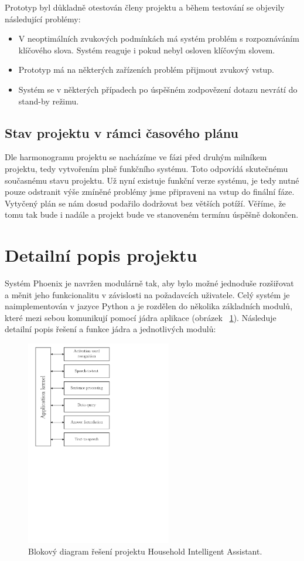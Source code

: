 \documentclass[12pt,a4paper]{article}
\begin{document}
Prototyp byl důkladně otestován členy projektu a během testování se objevily následující problémy: 
\begin{itemize}
	\item V neoptimálních zvukových podmínkách má systém problém s rozpoznáváním klíčového slova. Systém reaguje i pokud nebyl osloven klíčovým slovem.
	\item Prototyp má na některých zařízeních problém přijmout zvukový vstup.
	\item Systém se v některých případech po úspěšném zodpovězení dotazu nevrátí do stand-by režimu.
\end{itemize}


\subsection*{Stav projektu v rámci časového plánu}
Dle harmonogramu projektu se nacházíme ve fázi před druhým milníkem projektu, tedy vytvořením plně funkčního systému. Toto odpovídá skutečnému současnému stavu projektu. Už nyní existuje funkční verze systému, je tedy nutné pouze odstranit výše zmíněné problémy jsme připraveni na vstup do finální fáze. Vytyčený plán se nám dosud podařilo dodržovat bez větších potíží. Věříme, že tomu tak bude i nadále a projekt bude ve stanoveném termínu úspěšně dokončen.



\section*{Detailní popis projektu}
Systém Phoenix je navržen modulárně tak, aby bylo možné jednoduše rozšiřovat a měnit jeho funkcionalitu v závislosti na požadavcích uživatele. Celý systém je naimplementován v jazyce Python a je rozdělen do několika základních modulů, které mezi sebou komunikují pomocí jádra aplikace (obrázek ~\ref*{fig:diagram_api}). Následuje detailní popis řešení a funkce jádra a jednotlivých modulů:
\begin{figure}[ht]
	\begin{center}
		\includegraphics[height = 9cm]{blockDiagram.pdf}
		\caption{Blokový diagram řešení projektu Household Intelligent Assistant.}
		\label{fig:diagram_api}
	\end{center}
\end{figure}
\end{document}
